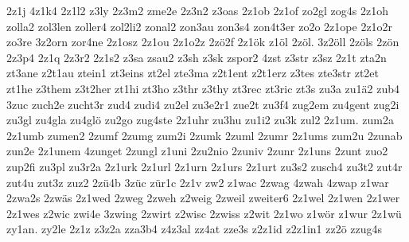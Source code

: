 {2z1j
4z1k4
2z1l2
z3ly
2z3m2
zme2e
2z3n2
z3oas
2z1ob
2z1of
zo2gl
zog4s
2z1oh
zolla2
zol3len
zoller4
zol2li2
zonal2
zon3au
zon3s4
zon4t3er
zo2o
2z1ope
2z1o2r
zo3re
3z2orn
zor4ne
2z1osz
2z1ou
2z1o2z
2zö2f
2z1ök
z1öl
2zöl.
3z2öll
2zöls
2zön
2z3p4
2z1q
2z3r2
2z1s2
z3sa
zsau2
z3sh
z3sk
zspor2
4zst
z3str
z3sz
2z1t
zta2n
zt3ane
z2t1au
ztein1
zt3eins
zt2el
zte3ma
z2t1ent
z2t1erz
z3tes
zte3str
zt2et
zt1he
z3them
z3t2her
zt1hi
zt3ho
z3thr
z3thy
zt3rec
zt3ric
zt3s
zu3a
zu1ä2
zub4
3zuc
zuch2e
zucht3r
zud4
zudi4
zu2el
zu3e2r1
zue2t
zu3f4
zug2em
zu4gent
zug2i
zu3gl
zu4gla
zu4glö
zu2go
zug4ste
2z1uhr
zu3hu
zu1i2
zu3k
zul2
2z1um.
zum2a
2z1umb
zumen2
2zumf
2zumg
zum2i
2zumk
2zuml
2zumr
2z1ums
zum2u
2zunab
zun2e
2z1unem
4zunget
2zungl
z1uni
2zu2nio
2zuniv
2zunr
2z1uns
2zunt
zuo2
zup2fi
zu3pl
zu3r2a
2z1urk
2z1url
2z1urn
2z1urs
2z1urt
zu3s2
zusch4
zu3t2
zut4r
zut4u
zut3z
zuz2
2zü4b
3züc
zür1c
2z1v
zw2
z1wac
2zwag
4zwah
4zwap
z1war
2zwa2s
2zwäs
2z1wed
2zweg
2zweh
z2weig
2zweil
zweiter6
2z1wel
2z1wen
2z1wer
2z1wes
z2wic
zwi4e
3zwing
2zwirt
z2wisc
2zwiss
z2wit
2z1wo
z1wör
z1wur
2z1wü
zy1an.
zy2le
2z1z
z3z2a
zza3b4
z4z3al
zz4at
zze3s
z2z1id
z2z1in1
zz2ö
zzug4s
}

\endinput

